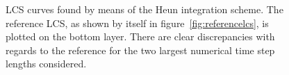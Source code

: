 \begin{figure}[htpb]
    \centering
    
    \caption[LCS curves found by means of the Heun integration scheme]{
        LCS curves found by means of the Heun integration scheme. The
        reference LCS, as shown by itself in figure~\ref{fig:referencelcs},
        is plotted on the bottom layer. There are clear discrepancies with
        regards to the reference for the two largest numerical time step
        lengths considered.}
    \label{fig:lcs_rk2}
\end{figure}
